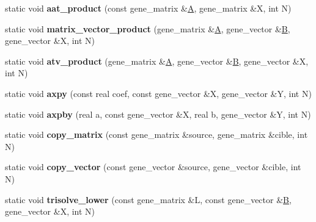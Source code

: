 \begin{DoxyCompactItemize}
\item 
\mbox{\label{classgmm__interface_a4757d90d58332b7198024841b403f7c5}} 
static void {\bfseries aat\+\_\+product} (const gene\+\_\+matrix \&\hyperlink{group___core___module_class_eigen_1_1_matrix}{A}, gene\+\_\+matrix \&X, int N)
\item 
\mbox{\label{classgmm__interface_a16dda411b3178039c1999ad1c9850ab8}} 
static void {\bfseries matrix\+\_\+vector\+\_\+product} (gene\+\_\+matrix \&\hyperlink{group___core___module_class_eigen_1_1_matrix}{A}, gene\+\_\+vector \&\hyperlink{group___core___module_class_eigen_1_1_matrix}{B}, gene\+\_\+vector \&X, int N)
\item 
\mbox{\label{classgmm__interface_a45360d829e5ef8588296e21bfd944f99}} 
static void {\bfseries atv\+\_\+product} (gene\+\_\+matrix \&\hyperlink{group___core___module_class_eigen_1_1_matrix}{A}, gene\+\_\+vector \&\hyperlink{group___core___module_class_eigen_1_1_matrix}{B}, gene\+\_\+vector \&X, int N)
\item 
\mbox{\label{classgmm__interface_a40e2c43541b9975952531d62e5396006}} 
static void {\bfseries axpy} (const real coef, const gene\+\_\+vector \&X, gene\+\_\+vector \&Y, int N)
\item 
\mbox{\label{classgmm__interface_abe2594eee753df865441080168cdfe8a}} 
static void {\bfseries axpby} (real a, const gene\+\_\+vector \&X, real b, gene\+\_\+vector \&Y, int N)
\item 
\mbox{\label{classgmm__interface_aa7c05e04a4584bbc1fb96933aef2d626}} 
static void {\bfseries copy\+\_\+matrix} (const gene\+\_\+matrix \&source, gene\+\_\+matrix \&cible, int N)
\item 
\mbox{\label{classgmm__interface_aca31758483bf3665afac4e2039e852cd}} 
static void {\bfseries copy\+\_\+vector} (const gene\+\_\+vector \&source, gene\+\_\+vector \&cible, int N)
\item 
\mbox{\label{classgmm__interface_abea99a97020bbe936bd6187980b4a485}} 
static void {\bfseries trisolve\+\_\+lower} (const gene\+\_\+matrix \&L, const gene\+\_\+vector \&\hyperlink{group___core___module_class_eigen_1_1_matrix}{B}, gene\+\_\+vector \&X, int N)

\end{DoxyCompactItemize}

